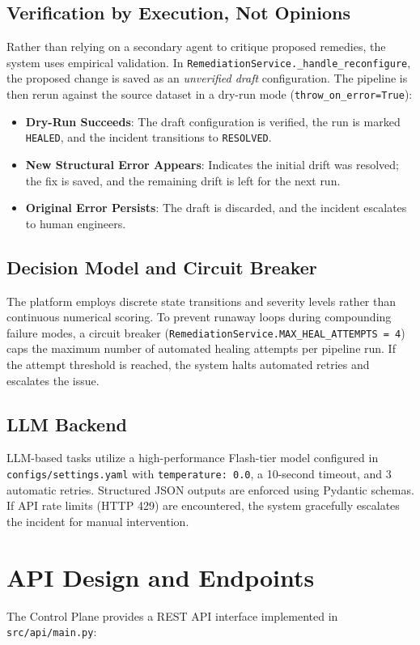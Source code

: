 \documentclass[11pt]{article}
\newcommand{\code}[1]{\texttt{\small #1}}
\begin{document}
\subsection{Verification by Execution, Not Opinions}
Rather than relying on a secondary agent to critique proposed remedies, the system uses empirical validation. In \code{RemediationService.\_handle\_reconfigure}, the proposed change is saved as an \emph{unverified draft} configuration. The pipeline is then rerun against the source dataset in a dry-run mode (\code{throw\_on\_error=True}):
\begin{itemize}
  \item \textbf{Dry-Run Succeeds}: The draft configuration is verified, the run is marked \code{HEALED}, and the incident transitions to \code{RESOLVED}.
  \item \textbf{New Structural Error Appears}: Indicates the initial drift was resolved; the fix is saved, and the remaining drift is left for the next run.
  \item \textbf{Original Error Persists}: The draft is discarded, and the incident escalates to human engineers.
\end{itemize}

\subsection{Decision Model and Circuit Breaker}
The platform employs discrete state transitions and severity levels rather than continuous numerical scoring. To prevent runaway loops during compounding failure modes, a circuit breaker (\code{RemediationService.MAX\_HEAL\_ATTEMPTS = 4}) caps the maximum number of automated healing attempts per pipeline run. If the attempt threshold is reached, the system halts automated retries and escalates the issue.

\subsection{LLM Backend}
LLM-based tasks utilize a high-performance Flash-tier model configured in \code{configs/settings.yaml} with \code{temperature: 0.0}, a 10-second timeout, and 3 automatic retries. Structured JSON outputs are enforced using Pydantic schemas. If API rate limits (HTTP 429) are encountered, the system gracefully escalates the incident for manual intervention.

\section{API Design and Endpoints}
The Control Plane provides a REST API interface implemented in \code{src/api/main.py}:
\end{document}
